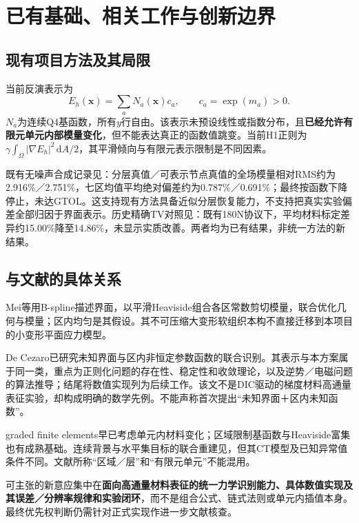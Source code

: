 \documentclass[11pt,a4paper]{ctexart}
\newcommand{\dd}{\,\mathrm d}
\begin{document}
\section{已有基础、相关工作与创新边界}
\subsection{现有项目方法及其局限}
当前反演表示为
\begin{equation}
 E_h(\mathbf x)=\sum_aN_a(\mathbf x)c_a,\qquad c_a=\exp(m_a)>0.
 \label{eq:baseline}
\end{equation}
$N_a$为连续Q4基函数，所有$y$行自由。该表示未预设线性或指数分布，且\textbf{已经允许有限元单元内部模量变化}，但不能表达真正的函数值跳变。当前H1正则为$\gamma\int_\Omega|\nabla E_h|^2\dd A/2$，其平滑倾向与有限元表示限制是不同因素。

既有无噪声合成记录见：分层真值／可表示节点真值的全场模量相对RMS约为2.916\%／2.751\%，七区均值平均绝对偏差约为0.787\%／0.691\%；最终按函数下降停止，未达GTOL。这支持现有方法具备近似分层恢复能力，不支持把真实实验偏差全部归因于界面表示。历史精确TV对照见：既有180N协议下，平均材料标定差异约15.00\%降至14.86\%，未显示实质改善。两者均为已有结果，非统一方法的新结果。

\subsection{与文献的具体关系}
Mei等\cite{mei2024}用B-spline描述界面，以平滑Heaviside组合各区常数剪切模量，联合优化几何与模量；区内均匀是其假设。其不可压缩大变形软组织本构不直接迁移到本项目的小变形平面应力模型。

De Cezaro\cite{cezaro2013}已研究未知界面与区内非恒定参数函数的联合识别。其表示与本方案属于同一类，重点为正则化问题的存在性、稳定性和收敛理论，以及逆势／电磁问题的算法推导；结尾将数值实现列为后续工作。该文不是DIC驱动的梯度材料高通量表征实验，却构成明确的数学先例。不能声称首次提出“未知界面＋区内未知函数”。

graded finite elements早已考虑单元内材料变化\cite{kim2002}；区域限制基函数与Heaviside富集也有成熟基础\cite{noel2022}。连续背景与水平集目标的联合重建见\cite{kadu2017}，但其CT模型及已知异常值条件不同。文献所称“区域／层”和“有限元单元”不能混用。

可主张的新意应集中在\textbf{面向高通量材料表征的统一力学识别能力、具体数值实现及其误差／分辨率规律和实验闭环}，而不是组合公式、链式法则或单元内插值本身。最终优先权判断仍需针对正式实现作进一步文献核查。
\end{document}
